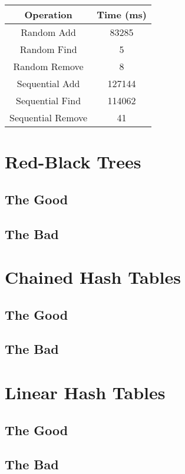 \documentclass{muformallab}
\begin{document}
  \begin{center}
    \begin{tabular}{c c}
      Operation & Time (ms) \\
      \hline
      Random Add & 83285 \\
      Random Find & 5 \\
      Random Remove & 8 \\
      Sequential Add & 127144 \\
      Sequential Find & 114062 \\
      Sequential Remove & 41 \\
    \end{tabular}
  \end{center}

  \section{Red-Black Trees}

  \subsection{The Good}

  \subsection{The Bad}


  \section{Chained Hash Tables}

  \subsection{The Good}

  \subsection{The Bad}


  \section{Linear Hash Tables}

  \subsection{The Good}

  \subsection{The Bad}
\end{document}
